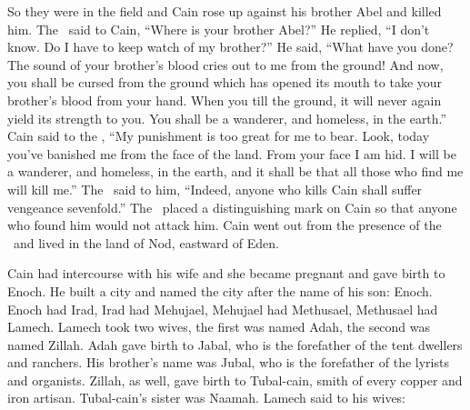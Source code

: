 \begin{inparaenum}
  So they were in the field and Cain rose up against his brother Abel and killed him.%
   The \lord\ said to Cain, ``Where is your brother Abel?'' He replied, ``I don't know. Do I have to keep watch of my brother?''%
   He said, ``What have you done? The sound of your brother's blood cries out to me from the ground!%
   And now, you shall be cursed from the ground which has opened its mouth to take your brother's blood from your hand.%
   When you till the ground, it will never again yield its strength to you. You shall be a wanderer, and homeless, in the earth.''%
   Cain said to the \lord, ``My punishment is too great for me to bear.%
   Look, today you've banished me from the face of the land. From your face I am hid. I will be a wanderer, and homeless, in the earth, and it shall be that all those who find me will kill me.''%
   The \lord\ said to him, ``Indeed, anyone who kills Cain shall suffer vengeance sevenfold.'' The \lord\ placed a distinguishing mark on Cain so that anyone who found him would not attack him.%
   Cain went out from the presence of the \lord\ and lived in the land of Nod, eastward of Eden.%

   Cain had intercourse with his wife and she became pregnant and gave birth to Enoch. He built a city and named the city after the name of his son: Enoch.%
   Enoch had Irad, Irad had Mehujael, Mehujael had Methusael, Methusael had Lamech.%
   Lamech took two wives, the first was named Adah, the second was named Zillah.%
   Adah gave birth to Jabal, who is the forefather of the tent dwellers and ranchers.%
   His brother's name was Jubal, who is the forefather of the lyrists and organists.%
   Zillah, as well, gave birth to Tubal-cain, smith of every copper and iron artisan. Tubal-cain's sister was Naamah.%
   Lamech said to his wives:\smallskip%


\end{inparaenum}
